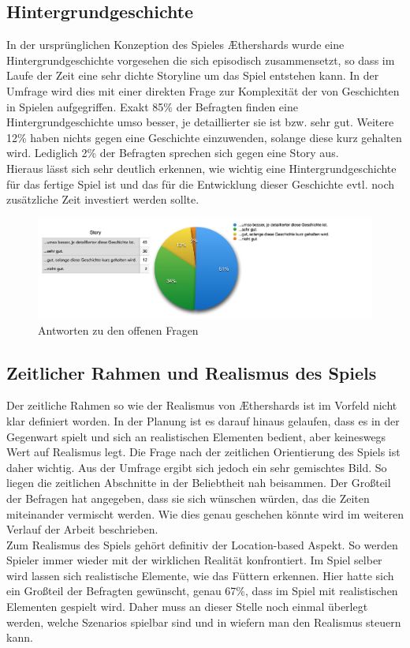 \subsection{Hintergrundgeschichte} 
In der ursprünglichen Konzeption des Spieles Æthershards wurde eine Hintergrundgeschichte vorgesehen die sich episodisch zusammensetzt, so dass im Laufe der Zeit eine sehr dichte Storyline um das Spiel entstehen kann. In der Umfrage wird dies mit einer direkten Frage zur Komplexität der von Geschichten in Spielen aufgegriffen. Exakt 85\% der Befragten finden eine Hintergrundgeschichte umso besser, je detaillierter sie ist bzw. sehr gut. Weitere 12\% haben nichts gegen eine Geschichte einzuwenden, solange diese kurz gehalten wird. Lediglich 2\% der Befragten sprechen sich gegen eine Story aus. \\
Hieraus lässt sich sehr deutlich erkennen, wie wichtig eine Hintergrundgeschichte für das fertige Spiel ist und das für die Entwicklung dieser Geschichte evtl. noch zusätzliche Zeit investiert werden sollte.

\begin{figure}[H]
    \centering
    \includegraphics[width=1.01\textwidth]{files/umfrage/story}
    \caption{Antworten zu den offenen Fragen}
\end{figure}

\subsection{Zeitlicher Rahmen und Realismus des Spiels} 
Der zeitliche Rahmen so wie der Realismus von Æthershards ist im Vorfeld nicht klar definiert worden. In der Planung ist es darauf hinaus gelaufen, dass es in der Gegenwart spielt und sich an realistischen Elementen bedient, aber keineswegs Wert auf Realismus legt. Die Frage nach der zeitlichen Orientierung des Spiels ist daher wichtig. Aus der Umfrage ergibt sich jedoch ein sehr gemischtes Bild. So liegen die zeitlichen Abschnitte in der Beliebtheit nah beisammen. Der Großteil der Befragen hat angegeben, dass sie sich wünschen würden, das die Zeiten miteinander vermischt werden. Wie dies genau geschehen könnte wird im weiteren Verlauf der Arbeit beschrieben. \\
Zum Realismus des Spiels gehört definitiv der Location-based Aspekt. So werden Spieler immer wieder mit der wirklichen Realität konfrontiert. Im Spiel selber wird lassen sich realistische Elemente, wie das Füttern erkennen. Hier hatte sich ein Großteil der Befragten gewünscht, genau 67\%, dass im Spiel mit realistischen Elementen gespielt wird. Daher muss an dieser Stelle noch einmal überlegt werden, welche Szenarios spielbar sind und in wiefern man den Realismus steuern kann. 


